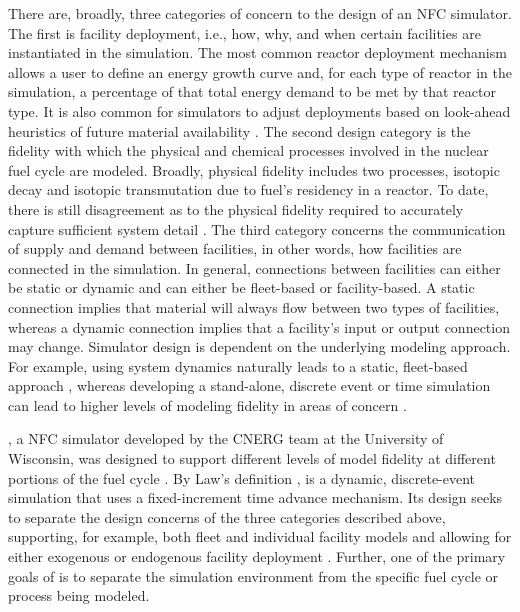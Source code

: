 There are, broadly, three categories of concern to the design of an NFC
simulator. The first is facility deployment, i.e., how, why, and when certain
facilities are instantiated in the simulation. The most common reactor
deployment mechanism allows a user to define an energy growth curve and, for
each type of reactor in the simulation, a percentage of that total energy demand
to be met by that reactor type. It is also common for simulators to adjust
deployments based on look-ahead heuristics of future material availability
\cite{schweitzer_improved_2008, van_den_durpel_daness_2009}. The second design
category is the fidelity with which the physical and chemical processes involved
in the nuclear fuel cycle are modeled. Broadly, physical fidelity includes two
processes, isotopic decay and isotopic transmutation due to fuel's residency in
a reactor. To date, there is still disagreement as to the physical fidelity
required to accurately capture sufficient system detail \cite{guerin_impact_2009}. The
third category concerns the communication of supply and demand between
facilities, in other words, how facilities are connected in the simulation. In
general, connections between facilities can either be static or dynamic and can
either be fleet-based or facility-based. A static connection implies that
material will always flow between two types of facilities, whereas a dynamic
connection implies that a facility's input or output connection may
change. Simulator design is dependent on the underlying modeling approach. For
example, using system dynamics \cite{forrester1971counterintuitive} naturally
leads to a static, fleet-based approach \cite{busquim_e_silva_system_2008,
  durpel_daness_2003, yacout_vision_2006}, whereas developing a stand-alone,
discrete event or time simulation \cite{Law:1999:SMA:554952} can lead to higher
levels of modeling fidelity in areas of concern \cite{schneider_nfcsim:_2005,
  mouginot2012class, boucher_cosi:_2006}.

\Cyclus, a NFC simulator developed by the CNERG team at the University of
Wisconsin, was designed to support different levels of model fidelity at
different portions of the fuel cycle \cite{huff_cyclus_2015}. By Law's
definition \cite{Law:1999:SMA:554952}, \Cyclus is a dynamic, discrete-event
simulation that uses a fixed-increment time advance mechanism. Its design seeks
to separate the design concerns of the three categories described above,
supporting, for example, both fleet and individual facility models and allowing
for either exogenous or endogenous facility deployment
\cite{carlsen_fleet_2016}. Further, one of the primary goals of \Cyclus is to separate the simulation environment from the specific fuel cycle or process being modeled.

